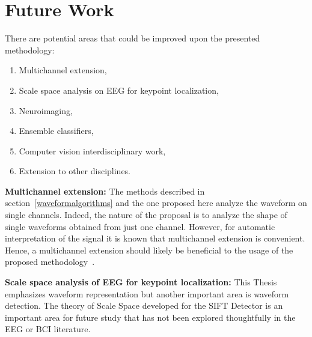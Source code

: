 
\section{Future Work}

There are potential areas that could be improved upon the presented methodology:

\begin{enumerate}
\item Multichannel extension,
\item Scale space analysis on EEG for keypoint localization,
\item Neuroimaging,
\item Ensemble classifiers,
\item Computer vision interdisciplinary work,
\item Extension to other disciplines.
\end{enumerate}

\textbf{Multichannel extension:}
The methods described in section~\ref{waveformalgorithms} and the one proposed here analyze the waveform on single channels.
Indeed, the nature of the proposal is to analyze the shape of single waveforms obtained from just one channel.  %
However, for automatic interpretation of the signal it is known that multichannel extension is convenient.  Hence, a multichannel extension should likely be beneficial to the usage of the proposed methodology~\cite{Gribonval2008}.

\textbf{Scale space analysis of EEG for keypoint localization:}
This Thesis emphasizes waveform representation but another important area is waveform detection.  The theory of Scale Space developed for the SIFT Detector is an important area for future study that has not been explored thoughtfully in the EEG or BCI literature.


